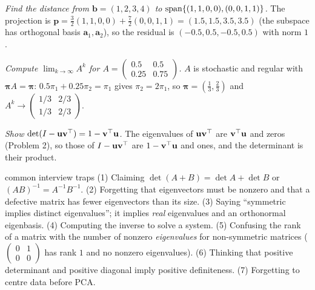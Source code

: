 \begin{example}
\emph{Find the distance from $\mathbf{b}=(1,2,3,4)$ to $\operatorname{span}\{(1,1,0,0),(0,0,1,1)\}$.} The projection is $\mathbf{p}=\frac32(1,1,0,0)+\frac72(0,0,1,1)=(1.5,1.5,3.5,3.5)$ (the subspace has orthogonal basis $\mathbf{a}_1,\mathbf{a}_2$), so the residual is $(-0.5,0.5,-0.5,0.5)$ with norm $1$.
\end{example}

\begin{example}
\emph{Compute $\lim_{k\to\infty}A^k$ for $A=\begin{pmatrix}0.5&0.5\\0.25&0.75\end{pmatrix}$.} $A$ is stochastic and regular with $\boldsymbol\pi A=\boldsymbol\pi$: $0.5\pi_1+0.25\pi_2=\pi_1$ gives $\pi_2=2\pi_1$, so $\boldsymbol\pi=(\tfrac13,\tfrac23)$ and $A^k\to\begin{pmatrix}1/3&2/3\\1/3&2/3\end{pmatrix}$.
\end{example}

\begin{example}
\emph{Show $\det(I-\mathbf{u}\mathbf{v}^{\top})=1-\mathbf{v}^{\top}\mathbf{u}$.} The eigenvalues of $\mathbf{u}\mathbf{v}^{\top}$ are $\mathbf{v}^{\top}\mathbf{u}$ and zeros (Problem 2), so those of $I-\mathbf{u}\mathbf{v}^{\top}$ are $1-\mathbf{v}^{\top}\mathbf{u}$ and ones, and the determinant is their product.
\end{example}

\begin{pitfall}{common interview traps}
(1) Claiming $\det(A+B)=\det A+\det B$ or $(AB)^{-1}=A^{-1}B^{-1}$. (2) Forgetting that eigenvectors must be nonzero and that a defective matrix has fewer eigenvectors than its size. (3) Saying ``symmetric implies distinct eigenvalues''; it implies \emph{real} eigenvalues and an orthonormal eigenbasis. (4) Computing the inverse to solve a system. (5) Confusing the rank of a matrix with the number of nonzero \emph{eigenvalues} for non-symmetric matrices ($\begin{pmatrix}0&1\\0&0\end{pmatrix}$ has rank $1$ and no nonzero eigenvalues). (6) Thinking that positive determinant and positive diagonal imply positive definiteness. (7) Forgetting to centre data before PCA.
\end{pitfall}

